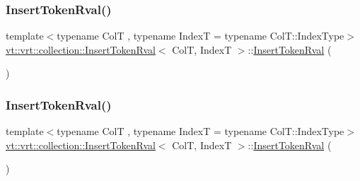 \subsubsection{\texorpdfstring{Insert\+Token\+Rval()}{InsertTokenRval()}\hspace{0.1cm}{\footnotesize\ttfamily [2/3]}}
{\footnotesize\ttfamily template$<$typename ColT , typename IndexT  = typename Col\+T\+::\+Index\+Type$>$ \\
\hyperlink{structvt_1_1vrt_1_1collection_1_1_insert_token_rval}{vt\+::vrt\+::collection\+::\+Insert\+Token\+Rval}$<$ ColT, IndexT $>$\+::\hyperlink{structvt_1_1vrt_1_1collection_1_1_insert_token_rval}{Insert\+Token\+Rval} (\begin{DoxyParamCaption}\item[{\hyperlink{structvt_1_1vrt_1_1collection_1_1_insert_token_rval}{Insert\+Token\+Rval}$<$ ColT, IndexT $>$ const \&}]{ }\end{DoxyParamCaption})\hspace{0.3cm}{\ttfamily [delete]}}

\mbox{\label{structvt_1_1vrt_1_1collection_1_1_insert_token_rval_ad7bd979f47256df2d3357e2232ca23c2}} 
\subsubsection{\texorpdfstring{Insert\+Token\+Rval()}{InsertTokenRval()}\hspace{0.1cm}{\footnotesize\ttfamily [3/3]}}
{\footnotesize\ttfamily template$<$typename ColT , typename IndexT  = typename Col\+T\+::\+Index\+Type$>$ \\
\hyperlink{structvt_1_1vrt_1_1collection_1_1_insert_token_rval}{vt\+::vrt\+::collection\+::\+Insert\+Token\+Rval}$<$ ColT, IndexT $>$\+::\hyperlink{structvt_1_1vrt_1_1collection_1_1_insert_token_rval}{Insert\+Token\+Rval} (\begin{DoxyParamCaption}\item[{\hyperlink{structvt_1_1vrt_1_1collection_1_1_insert_token_rval}{Insert\+Token\+Rval}$<$ ColT, IndexT $>$ \&\&}]{ }\end{DoxyParamCaption})\hspace{0.3cm}{\ttfamily [default]}}



